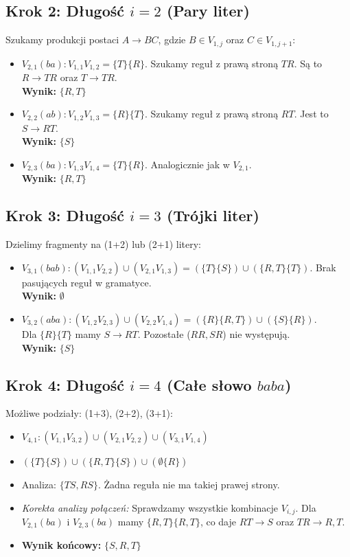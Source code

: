 \documentclass{article}
\begin{document}
\subsection*{Krok 2: Długość $i=2$ (Pary liter)}
Szukamy produkcji postaci $A \to BC$, gdzie $B \in V_{1,j}$ oraz $C \in V_{1,j+1}$:
\begin{itemize}
    \item $V_{2,1} (ba): V_{1,1}V_{1,2} = \{T\}\{R\}$. Szukamy reguł z prawą stroną $TR$. Są to $R \to TR$ oraz $T \to TR$. \\ \textbf{Wynik:} $\{R, T\}$
    \item $V_{2,2} (ab): V_{1,2}V_{1,3} = \{R\}\{T\}$. Szukamy reguł z prawą stroną $RT$. Jest to $S \to RT$. \\ \textbf{Wynik:} $\{S\}$
    \item $V_{2,3} (ba): V_{1,3}V_{1,4} = \{T\}\{R\}$. Analogicznie jak w $V_{2,1}$. \\ \textbf{Wynik:} $\{R, T\}$
\end{itemize}

\subsection*{Krok 3: Długość $i=3$ (Trójki liter)}
Dzielimy fragmenty na (1+2) lub (2+1) litery:
\begin{itemize}
    \item $V_{3,1} (bab): (V_{1,1}V_{2,2}) \cup (V_{2,1}V_{1,3}) = (\{T\}\{S\}) \cup (\{R, T\}\{T\})$. Brak pasujących reguł w gramatyce. \\ \textbf{Wynik:} $\emptyset$
    \item $V_{3,2} (aba): (V_{1,2}V_{2,3}) \cup (V_{2,2}V_{1,4}) = (\{R\}\{R, T\}) \cup (\{S\}\{R\})$. \\
    Dla $\{R\}\{T\}$ mamy $S \to RT$. Pozostałe ($RR, SR$) nie występują. \\ \textbf{Wynik:} $\{S\}$
\end{itemize}

\subsection*{Krok 4: Długość $i=4$ (Całe słowo $baba$)}
Możliwe podziały: (1+3), (2+2), (3+1):
\begin{itemize}
    \item $V_{4,1}: (V_{1,1}V_{3,2}) \cup (V_{2,1}V_{2,2}) \cup (V_{3,1}V_{1,4})$
    \item $(\{T\}\{S\}) \cup (\{R, T\}\{S\}) \cup (\emptyset\{R\})$
    \item Analiza: $\{TS, RS\}$. Żadna reguła nie ma takiej prawej strony.
    \item \textit{Korekta analizy połączeń:} Sprawdzamy wszystkie kombinacje $V_{i,j}$. Dla $V_{2,1}(ba)$ i $V_{2,3}(ba)$ mamy $\{R, T\}\{R, T\}$, co daje $RT \to S$ oraz $TR \to R, T$.
    \item \textbf{Wynik końcowy:} $\{S, R, T\}$
\end{itemize}
\end{document}
